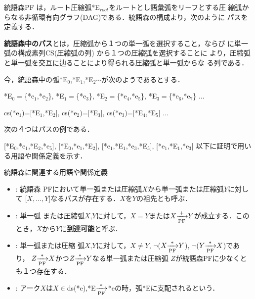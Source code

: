 統語森PF は，ルート圧縮弧*E$_{root}$をルートとし語彙弧をリーフとする圧
縮弧からなる非循環有向グラフ(DAG)である．統語森の構成より，次のように
パスを定義する．

\begin{definition}
{\bf 統語森中のパス}とは，圧縮弧から１つの単一弧を選択すること，ならび
に単一弧の構成素列CS(圧縮弧の列) から１つの圧縮弧を選択することに
より，圧縮弧と単一弧を交互に辿ることにより得られる圧縮弧と単一弧からな
る列である．
\end{definition}

{\mynoindent}今，統語森中の弧*E$_0$,*E$_1$,*E$_2{\cdots}$が次のようであるとする．

\mygapskip
\hspace{15mm}*E$_0=$\{*e$_1$,*e$_2$\}, *E$_1=$\{*e$_3$\}, *E$_2=$\{*e$_4$,*e$_5$\}, *E$_3=$\{*e$_6$,*e$_7$\} ${\ldots}$

\hspace{15mm}cs(*e$_1$)=[*E$_1$,*E$_2$], cs(*e$_2$)=[*E$_3$], cs(*e$_3$)=[*E$_4$,*E$_5$] ${\ldots}$
\mygapskip


{\mynoindent}次の４つはパスの例である．

\mygapskip
\hspace{15mm}[*E$_0$,*e$_1$,*E$_2$,*e$_5$], [*E$_0$,*e$_1$,*E$_2$], [*e$_1$,*E$_1$,*e$_3$,*E$_5$], [*e$_1$,*E$_1$,*e$_3$]
\mygapskip
{\mynoindent}以下に証明で用いる用語や関係定義を示す．

\myhalfskip
\hspace{-5mm}
\fbox
{
\begin{minipage}{13.7cm}
\mygapskip

統語森に関連する用語や関係定義

\begin{itemize}
\item[\myitemindent $X \: {\xrightarrow[{\rm PF}]{+}} \: Y$] : 統語森
PFにおいて単一弧または圧縮弧$X$から単一弧または圧縮弧$Y$に対して
[$X,{\ldots},Y$]なるパスが存在する．$X$を$Y$の祖先とも呼ぶ．
\item[\myitemindent $X \: {\xrightarrow[{\rm PF}]{*}} \: Y$] : 単一弧
または圧縮弧$X$,$Y$に対して，$X=Y$または$X{\xrightarrow[{\rm
PF}]{{\tiny +}}}Y$が成立する．このとき，$X$から$Y$に{\bf 到達可能}と呼ぶ．
\item[\myitemindent $X \: {\swarrow}${\tiny [PF]}${\searrow} \: Y$] : 単一弧または圧縮
弧$X$,$Y$に対して，$X{\neq}Y$,
$\neg$($X{\xrightarrow[{\rm PF}]{*}}Y$),
$\neg$($Y{\xrightarrow[{\rm PF}]{*}}X$)であり，
$Z{\xrightarrow[{\rm PF}]{*}}X$かつ$Z{\xrightarrow[{\rm PF}]{*}}Y$なる単一弧または圧縮弧
$Z$が統語森PFに少なくとも１つ存在する．
\item[\myitemindent 弧が支配するアーク] : アーク$X$は$X{\in}$ds(*e),*E${\xrightarrow[{\rm PF}]{{\tiny *}}}$*eの時，弧*Eに支配されるという．
\end{itemize}

\myhalfskip
\end{minipage}
}
\myhalfskip
\myhalfskip

